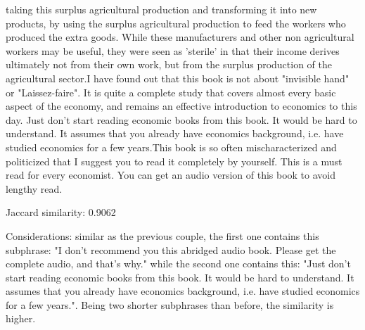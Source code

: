 \documentclass[12pt, a4paper[]{article}
\begin{document}
\begin{itemize}
{taking this surplus agricultural production and transforming it into new products, by using the surplus agricultural production to feed the workers who produced the extra goods. While these manufacturers and other non agricultural workers may be useful, they were seen as 'sterile' in that their income derives ultimately not from their own work, but from the surplus production of the agricultural sector.I have found out that this book is not about "invisible hand" or "Laissez-faire". It is quite a complete study that covers almost every basic aspect of the economy, and remains an effective introduction to economics to this day. Just don't start reading economic books from this book. It would be hard to understand. It assumes that you already have economics background, i.e. have studied economics for a few years.This book is so often mischaracterized and politicized that I suggest you to read it completely by yourself. This is a must read for every economist. You can get an audio version of this book to avoid lengthy read.
    \item Jaccard similarity: 0.9062
    \item Considerations: similar as the previous couple, the first one contains this subphrase: "I don't recommend you this abridged audio book. Please get the complete audio, and that's why." while the second one contains this: "Just don't start reading economic books from this book. It would be hard to understand. It assumes that you already have economics background, i.e. have studied economics for a few years.". Being two shorter subphrases than before, the similarity is higher.
    }
\end{itemize}
\end{document}
